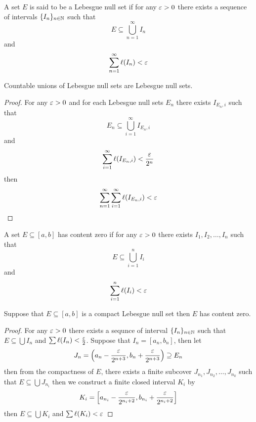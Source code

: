 \begin{definition}
  A set $E$ is said to be a Lebesgue null set if for any $\varepsilon > 0$ there exists a sequence of intervals $\{I_n\}_{n\in\mathbb N}$ such that
  \[E \subseteq \bigcup_{n=1}^{\infty}I_n\]
  and
  \[\sum_{n=1}^{\infty}\ell(I_n) < \varepsilon\]
\end{definition}

\begin{lemma}
  Countable unions of Lebesgue null sets are Lebesgue null sets.
\end{lemma}

\begin{proof}
  For any $\varepsilon > 0$ and for each Lebesgue null sets $E_n$ there exists $I_{E_n, i}$ such that 
  \[E_n \subseteq \bigcup_{i=1}^{\infty}I_{E_n, i}\] and \[ \sum_{i=1}^{\infty}\ell(I_{E_n, i}) < \frac{\varepsilon}{2^n}\]
  then
  \[ \sum_{n=1}^{\infty}\sum_{i=1}^{\infty}\ell(I_{E_n, i}) < \varepsilon\]
\end{proof}

\begin{definition}
  A set $E\subseteq [a, b]$ has content zero if for any $\varepsilon > 0$ there exists $I_1, I_2, \ldots, I_n$ such that
  \[E \subseteq \bigcup_{i=1}^{n}I_i\]
  and
  \[\sum_{i=1}^{n}\ell(I_i) < \varepsilon\] 
\end{definition}

\begin{lemma}
  Suppose that $E \subseteq [a, b]$ is a compact Lebesgue null set then $E$ has content zero.
\end{lemma}

\begin{proof}
  For any $\varepsilon > 0$ there exists a sequnce of interval 
  $\{I_n\}_{n \in \mathbb N}$ such that $E\subseteq \bigcup I_n$ and $\sum \ell(I_n) < \frac{\varepsilon}2$.
  Suppose that $I_n = [a_n, b_n]$, then let $$J_n = \left(a_n - \frac{\varepsilon}{2^{n+3}}, b_n + \frac{\varepsilon}{2^{n+3}}\right) \supseteq E_n$$ then
  from the compactness of $E$, there exists a finite subcover $J_{n_1}, J_{n_2}, \dotsc, J_{n_k}$ such that $E \subseteq \bigcup J_{n_i}$ 
  then we construct a finite closed interval $K_i$ by 
  $$K_i = \left[a_{n_i} - \frac{\varepsilon}{2^{n_i+2}}, b_{n_i} + \frac{\varepsilon}{2^{n_i+2}}\right]$$ then
  $E \subseteq \bigcup K_i$ and $\sum \ell(K_i) < \varepsilon$
\end{proof}